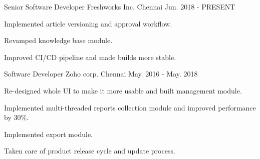 
\begin{cventries}
  \cventry
    {Senior Software Developer} %
    {Freshworks Inc.} %
    {Chennai} %
    {Jun. 2018 - PRESENT} %
    {
      \begin{cvitems} %
        \item {Implemented article versioning and approval workflow.}
        \item {Revamped knowledge base module.}
        \item {Improved CI/CD pipeline and made builds more stable.}
      \end{cvitems}
    }

  \cventry
    {Software Developer} %
    {Zoho corp.} %
    {Chennai} %
    {May. 2016 - May. 2018} %
    {
      \begin{cvitems} %
        \item {Re-designed whole UI to make it more usable and built management module.}
        \item {Implemented multi-threaded reports collection module and improved performance by 30\%.}
        \item {Implemented export module.}
        \item {Taken care of product release cycle and update process.}
      \end{cvitems}
    }    
\end{cventries}
